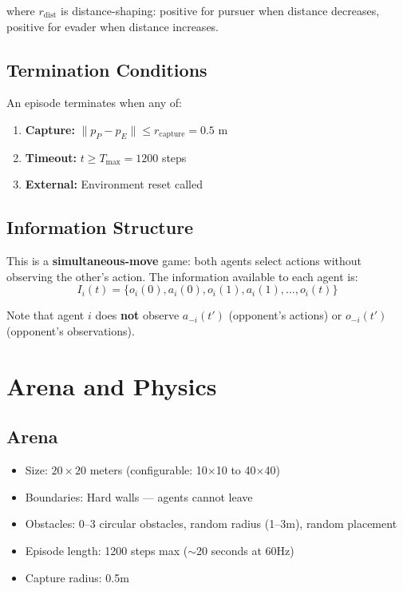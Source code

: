 \documentclass[11pt,a4paper]{report}
\begin{document}
where $r_{\text{dist}}$ is distance-shaping: positive for pursuer when distance decreases, positive for evader when distance increases.

\subsection{Termination Conditions}

An episode terminates when any of:
\begin{enumerate}
    \item \textbf{Capture:} $\|p_P - p_E\| \leq r_{\text{capture}} = 0.5$ m
    \item \textbf{Timeout:} $t \geq T_{\max} = 1200$ steps
    \item \textbf{External:} Environment reset called
\end{enumerate}

\subsection{Information Structure}

This is a \textbf{simultaneous-move} game: both agents select actions without observing the other's action. The information available to each agent is:
\begin{equation}
    I_i(t) = \{o_i(0), a_i(0), o_i(1), a_i(1), \ldots, o_i(t)\}
\end{equation}

Note that agent $i$ does \textbf{not} observe $a_{-i}(t')$ (opponent's actions) or $o_{-i}(t')$ (opponent's observations).

\section{Arena and Physics}

\subsection{Arena}
\begin{itemize}
    \item Size: $20 \times 20$ meters (configurable: 10$\times$10 to 40$\times$40)
    \item Boundaries: Hard walls --- agents cannot leave
    \item Obstacles: 0--3 circular obstacles, random radius (1--3m), random placement
    \item Episode length: 1200 steps max ($\sim$20 seconds at 60Hz)
    \item Capture radius: 0.5m
\end{itemize}
\end{document}
